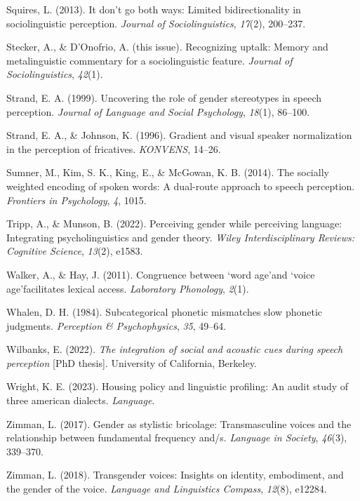 \documentclass[
  letterpaper,
  DIV=11,
  numbers=noendperiod]{scrartcl}
\newlength{\cslhangindent}
\newenvironment{CSLReferences}[2] %
 {\begin{list}{}{%
  \setlength{\itemindent}{0pt}
  \setlength{\leftmargin}{0pt}
  \setlength{\parsep}{0pt}
  \ifodd #1
   \setlength{\leftmargin}{\cslhangindent}
   \setlength{\itemindent}{-1\cslhangindent}
  \fi
  \setlength{\itemsep}{#2\baselineskip}}}
 {\end{list}}
\begin{document}
\begin{CSLReferences}{1}{0}
Squires, L. (2013). It don't go both ways: Limited bidirectionality in
sociolinguistic perception. \emph{Journal of Sociolinguistics},
\emph{17}(2), 200--237.

Stecker, A., \& D'Onofrio, A. (this issue). Recognizing uptalk: Memory
and metalinguistic commentary for a sociolinguistic feature.
\emph{Journal of Sociolinguistics}, \emph{42}(1).

Strand, E. A. (1999). Uncovering the role of gender stereotypes in
speech perception. \emph{Journal of Language and Social Psychology},
\emph{18}(1), 86--100.

Strand, E. A., \& Johnson, K. (1996). Gradient and visual speaker
normalization in the perception of fricatives. \emph{KONVENS}, 14--26.

Sumner, M., Kim, S. K., King, E., \& McGowan, K. B. (2014). The socially
weighted encoding of spoken words: A dual-route approach to speech
perception. \emph{Frontiers in Psychology}, \emph{4}, 1015.

Tripp, A., \& Munson, B. (2022). Perceiving gender while perceiving
language: Integrating psycholinguistics and gender theory. \emph{Wiley
Interdisciplinary Reviews: Cognitive Science}, \emph{13}(2), e1583.

Walker, A., \& Hay, J. (2011). Congruence between `word age'and `voice
age'facilitates lexical access. \emph{Laboratory Phonology},
\emph{2}(1).

Whalen, D. H. (1984). Subcategorical phonetic mismatches slow phonetic
judgments. \emph{Perception \& {Psychophysics}}, \emph{35}, 49--64.

Wilbanks, E. (2022). \emph{The integration of social and acoustic cues
during speech perception} {[}PhD thesis{]}. University of California,
Berkeley.

Wright, K. E. (2023). Housing policy and linguistic profiling: An audit
study of three american dialects. \emph{Language}.

Zimman, L. (2017). Gender as stylistic bricolage: Transmasculine voices
and the relationship between fundamental frequency and/s. \emph{Language
in Society}, \emph{46}(3), 339--370.

Zimman, L. (2018). Transgender voices: Insights on identity, embodiment,
and the gender of the voice. \emph{Language and Linguistics Compass},
\emph{12}(8), e12284.

\end{CSLReferences}
\end{document}
